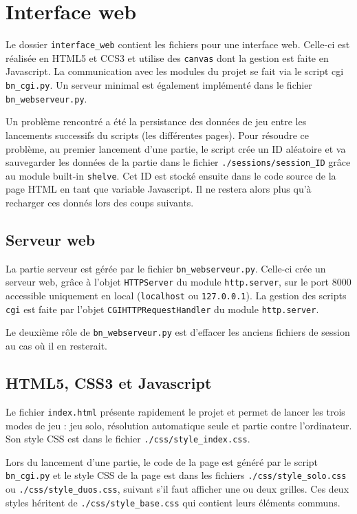 \chapter{Interface web}

Le dossier \texttt{interface\_web} contient les fichiers pour une interface web. Celle-ci est réalisée en HTML5 et CCS3 et utilise des \texttt{canvas} dont la gestion est faite en Javascript. La communication avec les modules du projet se fait via le script cgi \texttt{bn\_cgi.py}. Un serveur minimal est également implémenté dans le fichier \texttt{bn\_webserveur.py}.

Un problème rencontré a été la persistance des données de jeu entre les lancements successifs du scripts (les différentes pages). Pour résoudre ce problème, au premier lancement d'une partie, le script crée un ID aléatoire et va sauvegarder les données de la partie dans le fichier \texttt{./sessions/session\_ID} grâce au module built-in \texttt{shelve}. Cet ID est stocké ensuite dans le code source de la page HTML en tant que variable Javascript. Il ne restera alors plus qu'à recharger ces donnés lors des coups suivants.

\section{Serveur web}
La partie serveur est gérée par le fichier \texttt{bn\_webserveur.py}.
Celle-ci crée un serveur web, grâce à l'objet \texttt{HTTPServer} du module  \texttt{http.server}, sur le port 8000 accessible uniquement en local (\texttt{localhost} ou \texttt{127.0.0.1}). La gestion des scripts \texttt{cgi} est faite par l'objet \texttt{CGIHTTPRequestHandler} du module \texttt{http.server}.

Le deuxième rôle de \texttt{bn\_webserveur.py} est d'effacer les anciens fichiers de session au cas où il en resterait.

\section{HTML5, CSS3 et Javascript}
Le fichier \texttt{index.html} présente rapidement le projet et permet de lancer les trois modes de jeu : jeu solo, résolution automatique seule et partie contre l'ordinateur. Son style CSS est dans le fichier \texttt{./css/style\_index.css}.

Lors du lancement d'une partie, le code de la page est généré par le script \texttt{bn\_cgi.py} et le style CSS de la page est dans les fichiers \texttt{./css/style\_solo.css} ou \texttt{./css/style\_duos.css}, suivant s'il faut afficher une ou deux grilles. Ces deux styles héritent de \texttt{./css/style\_base.css} qui contient leurs éléments communs.

